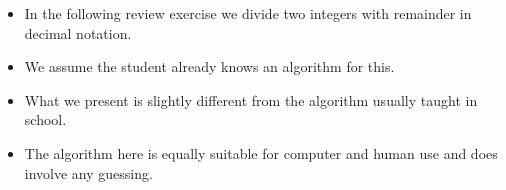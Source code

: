 \begin{frame}
\begin{itemize}
\item In the following review exercise we divide two integers with remainder in decimal notation.
\item<2-> We assume the student already knows an algorithm for this.
\item<3-> What we present is slightly different from the algorithm usually taught in school.
\item<4-> The algorithm here is equally suitable for computer and human use and does involve any guessing.
\end{itemize}
\end{frame}
